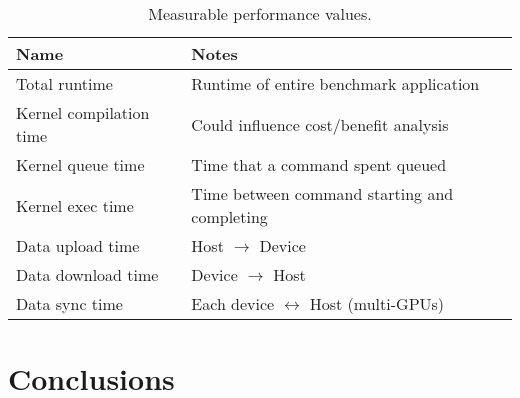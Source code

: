 \begin{table}
\footnotesize
\centering
\begin{tabular}{| l | l |}
  \hline
  \textbf{Name} & \textbf{Notes}\\
  \hline
  Total runtime & Runtime of entire benchmark application\\
  Kernel compilation time & Could influence cost/benefit analysis\\
  Kernel queue time & Time that a command spent queued\\
  Kernel exec time & Time between command starting and completing\\
  Data upload time & Host $\rightarrow$ Device\\
  Data download time & Device $\rightarrow$ Host\\
  Data sync time & Each device $\leftrightarrow$ Host (multi-GPUs)\\
  \hline
\end{tabular}
\caption{Measurable performance values.}
\label{tab:metric}
\end{table}

\section{Conclusions}

\label{bibliography}
\printbibliography

